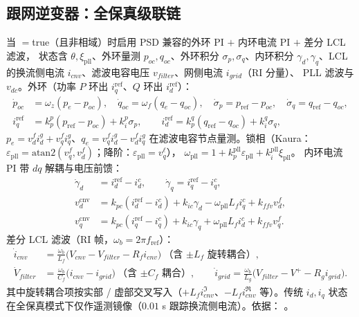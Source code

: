 \subsection{跟网逆变器：全保真级联链}
\label{sec:dynamics-gfl-full}
当 $=$true（且非相域）时启用 PSD 兼容的外环 PI $+$ 内环电流 PI $+$ 差分 LCL 滤波，
状态含 $\theta,\xi_{\mathrm{pll}}$、外环量测 $p_{oc},q_{oc}$、外环积分 $\sigma_p,\sigma_q$、内环积分
$\gamma_d,\gamma_q$、LCL 的换流侧电流 $i_{cnv}$、滤波电容电压 $v_{filter}$、网侧电流 $i_{grid}$（RI 分量）、
PLL 滤波与 $v_{dc}$。外环（功率 $P$ 环出 $i_q^{\mathrm{ref}}$、$Q$ 环出 $i_d^{\mathrm{ref}}$）：
\begin{align}
 \dot p_{oc}&=\omega_z(p_e-p_{oc}),\quad \dot q_{oc}=\omega_f(q_e-q_{oc}),\quad
 \dot\sigma_p=p_{\mathrm{ref}}-p_{oc},\quad \dot\sigma_q=q_{\mathrm{ref}}-q_{oc},\\
 i_q^{\mathrm{ref}}&=k_p^{p}(p_{\mathrm{ref}}-p_{oc})+k_i^{p}\sigma_p,\qquad
 i_d^{\mathrm{ref}}=k_p^{q}(q_{\mathrm{ref}}-q_{oc})+k_i^{q}\sigma_q,
\end{align}
$p_e=v_d^f i_d^g+v_q^f i_q^g$、$q_e=v_q^f i_d^g-v_d^f i_q^g$ 在滤波电容节点量测。锁相（Kaura：
$\varepsilon_{\mathrm{pll}}=\mathrm{atan2}(v_q^f,v_d^f)$；降阶：$\varepsilon_{\mathrm{pll}}=v_q^\ell$），
$\omega_{\mathrm{pll}}=1+k_p^{\mathrm{pll}}\varepsilon_{\mathrm{pll}}+k_i^{\mathrm{pll}}\xi_{\mathrm{pll}}$。
内环电流 PI 带 $dq$ 解耦与电压前馈：
\begin{align}
 \dot\gamma_d&=i_d^{\mathrm{ref}}-i_d^c,\qquad \dot\gamma_q=i_q^{\mathrm{ref}}-i_q^c,\\
 v_d^{\mathrm{cnv}}&=k_{pc}(i_d^{\mathrm{ref}}-i_d^c)+k_{ic}\gamma_d-\omega_{\mathrm{pll}}L_f i_q^c+k_{ffv}v_d^f,\\
 v_q^{\mathrm{cnv}}&=k_{pc}(i_q^{\mathrm{ref}}-i_q^c)+k_{ic}\gamma_q+\omega_{\mathrm{pll}}L_f i_d^c+k_{ffv}v_q^f.
\end{align}
差分 LCL 滤波（RI 帧，$\omega_b=2\pi f_{\mathrm{ref}}$）：
\begin{align}
 \dot i_{cnv}&=\frac{\omega_b}{L_f}\big(V_{cnv}-V_{filter}-R_f i_{cnv}\big)\ \text{（含 $\pm L_f$ 旋转耦合）},\\
 \dot V_{filter}&=\frac{\omega_b}{C_f}\big(i_{cnv}-i_{grid}\big)\ \text{（含 $\pm C_f$ 耦合）},\qquad
 \dot i_{grid}=\frac{\omega_b}{L_g}\big(V_{filter}-V^+-R_g i_{grid}\big).
\end{align}
其中旋转耦合项按实部 / 虚部交叉写入（$+L_f i_{cnv}^{\Im}$、$-L_f i_{cnv}^{\Re}$ 等）。传统 $i_d,i_q$
状态在全保真模式下仅作遥测镜像（$0.01$ s 跟踪换流侧电流）。依据：
。

